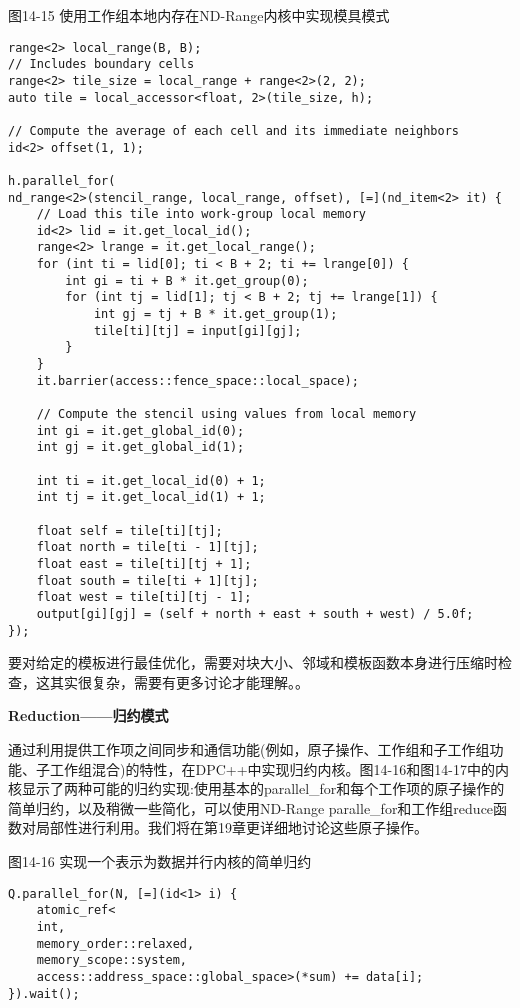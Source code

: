 \hspace*{\fill} \par %
图14-15 使用工作组本地内存在ND-Range内核中实现模具模式
\begin{lstlisting}[caption={}]
range<2> local_range(B, B);
// Includes boundary cells
range<2> tile_size = local_range + range<2>(2, 2);
auto tile = local_accessor<float, 2>(tile_size, h);

// Compute the average of each cell and its immediate neighbors
id<2> offset(1, 1);

h.parallel_for(
nd_range<2>(stencil_range, local_range, offset), [=](nd_item<2> it) {
	// Load this tile into work-group local memory
	id<2> lid = it.get_local_id();
	range<2> lrange = it.get_local_range();
	for (int ti = lid[0]; ti < B + 2; ti += lrange[0]) {
		int gi = ti + B * it.get_group(0);
		for (int tj = lid[1]; tj < B + 2; tj += lrange[1]) {
			int gj = tj + B * it.get_group(1);
			tile[ti][tj] = input[gi][gj];
		}
	}
	it.barrier(access::fence_space::local_space);
	
	// Compute the stencil using values from local memory
	int gi = it.get_global_id(0);
	int gj = it.get_global_id(1);
	
	int ti = it.get_local_id(0) + 1;
	int tj = it.get_local_id(1) + 1;
	
	float self = tile[ti][tj];
	float north = tile[ti - 1][tj];
	float east = tile[ti][tj + 1];
	float south = tile[ti + 1][tj];
	float west = tile[ti][tj - 1];
	output[gi][gj] = (self + north + east + south + west) / 5.0f;
});
\end{lstlisting}

要对给定的模板进行最佳优化，需要对块大小、邻域和模板函数本身进行压缩时检查，这其实很复杂，需要有更多讨论才能理解。。\par

\hspace*{\fill} \par %
\textbf{Reduction——归约模式}

通过利用提供工作项之间同步和通信功能(例如，原子操作、工作组和子工作组功能、子工作组混合)的特性，在DPC++中实现归约内核。图14-16和图14-17中的内核显示了两种可能的归约实现:使用基本的parallel\_for和每个工作项的原子操作的简单归约，以及稍微一些简化，可以使用ND-Range paralle\_for和工作组reduce函数对局部性进行利用。我们将在第19章更详细地讨论这些原子操作。\par

\hspace*{\fill} \par %
图14-16 实现一个表示为数据并行内核的简单归约
\begin{lstlisting}[caption={}]
Q.parallel_for(N, [=](id<1> i) {
	atomic_ref<
	int,
	memory_order::relaxed,
	memory_scope::system,
	access::address_space::global_space>(*sum) += data[i];
}).wait();
\end{lstlisting}

